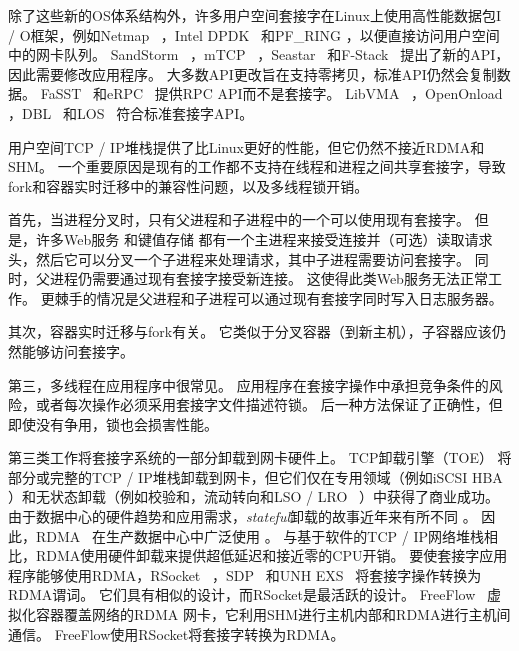 除了这些新的OS体系结构外，许多用户空间套接字在Linux上使用高性能数据包I / O框架，例如Netmap~ \cite {rizzo2012netmap}，Intel DPDK~ \cite {dpdk}和PF\_RING \cite {pf-ring}，以便直接访问用户空间中的网卡队列。
SandStorm~ \cite {marinos2014network}，mTCP~ \cite {jeong2014mtcp}，Seastar~ \cite {seastar}和F-Stack~ \cite {fstack}提出了新的API，因此需要修改应用程序。
大多数API更改旨在支持零拷贝，标准API仍然会复制数据。
FaSST~ \cite {kalia2016fasst}和eRPC~ \cite {kalia2018datacenter}提供RPC API而不是套接字。
LibVMA~ \cite {libvma}，OpenOnload~ \cite {openonload}，DBL~ \cite {dbl}和LOS~ \cite {huang2017high}符合标准套接字API。

用户空间TCP / IP堆栈提供了比Linux更好的性能，但它仍然不接近RDMA和SHM。
一个重要原因是现有的工作都不支持在线程和进程之间共享套接字，导致fork和容器实时迁移中的兼容性问题，以及多线程锁开销。

首先，当进程分叉时，只有父进程和子进程中的一个可以使用现有套接字。
但是，许多Web服务 \cite {apache,nginx,php-fpm,python-gunicorn,vsftpd}和键值存储 \cite {memcached}都有一个主进程来接受连接并（可选）读取请求头，然后它可以分叉一个子进程来处理请求，其中子进程需要访问套接字。
同时，父进程仍需要通过现有套接字接受新连接。
这使得此类Web服务无法正常工作。
更棘手的情况是父进程和子进程可以通过现有套接字同时写入日志服务器。

其次，容器实时迁移与fork有关。
它类似于分叉容器（到新主机），子容器应该仍然能够访问套接字。

第三，多线程在应用程序中很常见。
应用程序在套接字操作中承担竞争条件的风险，或者每次操作必须采用套接字文件描述符锁。
后一种方法保证了正确性，但即使没有争用，锁也会损害性能。

第三类工作将套接字系统的一部分卸载到网卡硬件上。
TCP卸载引擎（TOE） \cite {tcp-chimney-offload}将部分或完整的TCP / IP堆栈卸载到网卡，但它们仅在专用领域（例如iSCSI HBA~ \cite {iscsi-hba}）和无状态卸载（例如校验和，流动转向和LSO / LRO~ \cite {lsolro}）中获得了商业成功。
由于数据中心的硬件趋势和应用需求，\emph {stateful}卸载的故事近年来有所不同 \cite {chuanxiong-rdma-keynote}。
因此，RDMA~ \cite {infiniband2000infiniband}在生产数据中心中广泛使用 \cite {guo2016rdma}。
与基于软件的TCP / IP网络堆栈相比，RDMA使用硬件卸载来提供超低延迟和接近零的CPU开销。
要使套接字应用程序能够使用RDMA，RSocket~ \cite {rsockets}，SDP~ \cite {socketsdirect}和UNH EXS~ \cite {russell2008extended}将套接字操作转换为RDMA谓词。
它们具有相似的设计，而RSocket是最活跃的设计。
FreeFlow~ \cite {nsdi19freeflow}虚拟化容器覆盖网络的RDMA 网卡，它利用SHM进行主机内部和RDMA进行主机间通信。
FreeFlow使用RSocket将套接字转换为RDMA。


